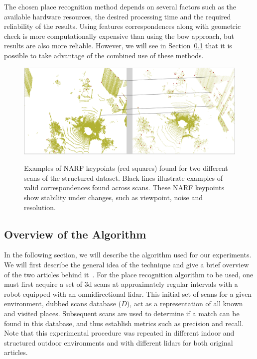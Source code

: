 The chosen place recognition method depends on several factors such as the available hardware resources, the desired processing time and the required reliability of the results. Using features correspondences along with geometric check is more computationally expensive than using the \gls*{bow} approach, but results are also more reliable. However, we will see in Section~\ref{ssec:chap_slam_algo} that it is possible to take advantage of the combined use of these methods.

\begin{figure}
    \centering
    \includegraphics[width=0.995\linewidth]{img/chap_slam/features_line.png}\\
    \caption[Examples of NARF keypoints found for two different scans with examples of correspondences.]{Examples of NARF keypoints (red squares) found for two different scans of the structured dataset. Black lines illustrate examples of valid correspondences found across scans. These NARF keypoints show stability under changes, such as viewpoint, noise and resolution.}
    \label{fig:chap_slam_features_correspondences}
\end{figure}


\subsection{Overview of the Algorithm}
\label{ssec:chap_slam_algo}

In the following section, we will describe the algorithm used for our experiments. We will first describe the general idea of the technique and give a brief overview of the two articles behind it~\citep{Steder2010, Steder2011b}. For the place recognition algorithm to be used, one must first acquire a set of \gls*{3d} scans at approximately regular intervals with a robot equipped with an omnidirectional \gls*{lidar}. This initial set of scans for a given environment, dubbed scans database ($D$), act as a representation of all known and visited places. Subsequent scans are used to determine if a match can be found in this database, and thus establish metrics such as precision and recall. Note that this experimental procedure was repeated in different indoor and structured outdoor environments and with different \gls*{lidar}s for both original articles.

